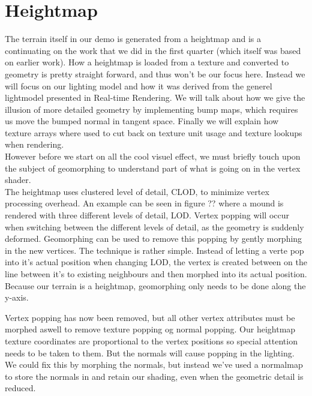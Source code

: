 \chapter{Heightmap}


The terrain itself in our demo is generated from a heightmap and is a
continuating on the work that we did in the first quarter (which
itself was based on earlier work). How a heightmap is loaded from a
texture and converted to geometry is pretty straight forward, and thus
won't be our focus here. Instead we will focus on our lighting model
and how it was derived from the generel lightmodel presented in
Real-time Rendering. We will talk about how we give the illusion of
more detailed geometry by implementing bump maps, which requires us
move the bumped normal in tangent space. Finally we will explain how
texture arrays where used to cut back on texture unit usage and
texture lookups when rendering.\\

However before we start on all the cool visuel effect, we must briefly
touch upon the subject of geomorphing to understand part of what is
going on in the vertex shader.\\

The heightmap uses clustered level of detail, CLOD, to minimize vertex
processing overhead. An example can be seen in figure ?? where a mound
is rendered with three different levels of detail, LOD. Vertex popping will
occur when switching between the different levels of detail, as the
geometry is suddenly deformed. Geomorphing can be used to remove this
popping by gently morphing in the new vertices. The technique is
rather simple. Instead of letting a verte pop into it's actual
position when changing LOD, the vertex is created between on the line
between it's to existing neighbours and then morphed into its actual
position. Because our terrain is a heightmap, geomorphing only needs
to be done along the y-axis.


Vertex popping has now been removed, but all other vertex attributes
must be morphed aswell to remove texture popping og normal
popping. Our heightmap texture coordinates are proportional to the
vertex positions so special attention needs to be taken to them. But
the normals will cause popping in the lighting. We could fix this by
morphing the normals, but instead we've used a normalmap to store the
normals in and retain our shading, even when the geometric detail is
reduced.

